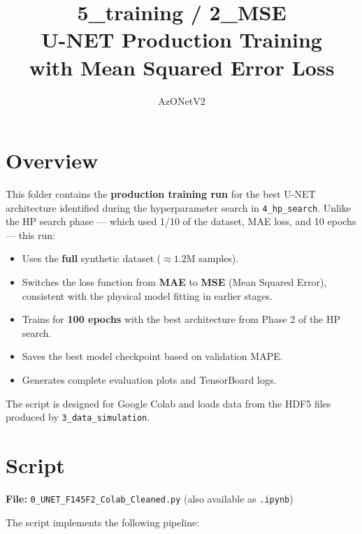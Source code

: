\documentclass[11pt,a4paper]{article}
\title{\textbf{5\_training / 2\_MSE} \\ U-NET Production Training \\ with Mean Squared Error Loss}
\author{AzONetV2}
\date{}
\begin{document}
\maketitle

\section{Overview}

This folder contains the \textbf{production training run} for the best U-NET architecture identified during the hyperparameter search in \texttt{4\_hp\_search}. Unlike the HP search phase — which used 1/10 of the dataset, MAE loss, and 10 epochs — this run:

\begin{itemize}
    \item Uses the \textbf{full} synthetic dataset ($\approx 1.2$M samples).
    \item Switches the loss function from \textbf{MAE} to \textbf{MSE} (Mean Squared Error), consistent with the physical model fitting in earlier stages.
    \item Trains for \textbf{100 epochs} with the best architecture from Phase 2 of the HP search.
    \item Saves the best model checkpoint based on validation MAPE.
    \item Generates complete evaluation plots and TensorBoard logs.
\end{itemize}

The script is designed for Google Colab and loads data from the HDF5 files produced by \texttt{3\_data\_simulation}.

\section{Script}

\textbf{File:} \texttt{0\_UNET\_F145F2\_Colab\_Cleaned.py} (also available as \texttt{.ipynb})

The script implements the following pipeline:
\end{document}
